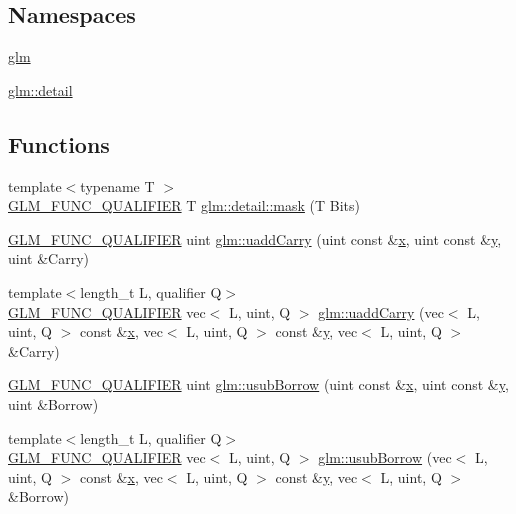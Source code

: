 \subsection*{Namespaces}
\begin{DoxyCompactItemize}
\item 
 \hyperlink{namespaceglm}{glm}
\item 
 \hyperlink{namespaceglm_1_1detail}{glm\+::detail}
\end{DoxyCompactItemize}
\subsection*{Functions}
\begin{DoxyCompactItemize}
\item 
{\footnotesize template$<$typename T $>$ }\\\hyperlink{setup_8hpp_a33fdea6f91c5f834105f7415e2a64407}{G\+L\+M\+\_\+\+F\+U\+N\+C\+\_\+\+Q\+U\+A\+L\+I\+F\+I\+ER} T \hyperlink{namespaceglm_1_1detail_a048ad00e8777f9f3ebe185ed48857df0}{glm\+::detail\+::mask} (T Bits)
\item 
\hyperlink{setup_8hpp_a33fdea6f91c5f834105f7415e2a64407}{G\+L\+M\+\_\+\+F\+U\+N\+C\+\_\+\+Q\+U\+A\+L\+I\+F\+I\+ER} uint \hyperlink{namespaceglm_a541d30d3289d3a3da69edec69df11a04}{glm\+::uadd\+Carry} (uint const \&\hyperlink{_s_d_l__opengl_8h_ad0e63d0edcdbd3d79554076bf309fd47}{x}, uint const \&\hyperlink{_s_d_l__opengl_8h_a1675d9d7bb68e1657ff028643b4037e3}{y}, uint \&Carry)
\item 
{\footnotesize template$<$length\+\_\+t L, qualifier Q$>$ }\\\hyperlink{setup_8hpp_a33fdea6f91c5f834105f7415e2a64407}{G\+L\+M\+\_\+\+F\+U\+N\+C\+\_\+\+Q\+U\+A\+L\+I\+F\+I\+ER} vec$<$ L, uint, Q $>$ \hyperlink{group__core__func__integer_gaedcec48743632dff6786bcc492074b1b}{glm\+::uadd\+Carry} (vec$<$ L, uint, Q $>$ const \&\hyperlink{_s_d_l__opengl_8h_ad0e63d0edcdbd3d79554076bf309fd47}{x}, vec$<$ L, uint, Q $>$ const \&\hyperlink{_s_d_l__opengl_8h_a1675d9d7bb68e1657ff028643b4037e3}{y}, vec$<$ L, uint, Q $>$ \&Carry)
\item 
\hyperlink{setup_8hpp_a33fdea6f91c5f834105f7415e2a64407}{G\+L\+M\+\_\+\+F\+U\+N\+C\+\_\+\+Q\+U\+A\+L\+I\+F\+I\+ER} uint \hyperlink{namespaceglm_ac7a75ea277a43b855920597adeebb2e3}{glm\+::usub\+Borrow} (uint const \&\hyperlink{_s_d_l__opengl_8h_ad0e63d0edcdbd3d79554076bf309fd47}{x}, uint const \&\hyperlink{_s_d_l__opengl_8h_a1675d9d7bb68e1657ff028643b4037e3}{y}, uint \&Borrow)
\item 
{\footnotesize template$<$length\+\_\+t L, qualifier Q$>$ }\\\hyperlink{setup_8hpp_a33fdea6f91c5f834105f7415e2a64407}{G\+L\+M\+\_\+\+F\+U\+N\+C\+\_\+\+Q\+U\+A\+L\+I\+F\+I\+ER} vec$<$ L, uint, Q $>$ \hyperlink{group__core__func__integer_gae3316ba1229ad9b9f09480833321b053}{glm\+::usub\+Borrow} (vec$<$ L, uint, Q $>$ const \&\hyperlink{_s_d_l__opengl_8h_ad0e63d0edcdbd3d79554076bf309fd47}{x}, vec$<$ L, uint, Q $>$ const \&\hyperlink{_s_d_l__opengl_8h_a1675d9d7bb68e1657ff028643b4037e3}{y}, vec$<$ L, uint, Q $>$ \&Borrow)

\end{DoxyCompactItemize}
